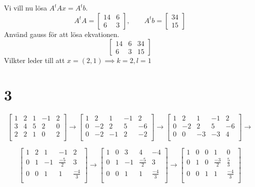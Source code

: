 \documentclass{article}
\begin{document}
Vi vill nu lösa $A^t A x = A^t b$. \\
$$
A^t A = 
\begin{bmatrix}
    14  &  6 \\
    6  &  3 
\end{bmatrix}
,\qquad
A^t b = 
\begin{bmatrix}
    34   \\
    15
\end{bmatrix}
$$
Använd gauss för att lösa ekvationen.
$$
\begin{bmatrix}
    14  &  6  & 34 \\
    6   &  3  & 15
\end{bmatrix}
$$
Vilkter leder till att $x = (2,1) \implies k = 2, l = 1$
\section*{3}
$$
\begin{bmatrix}
    1  &  2  &  1  & -1  &  2 \\
    3  &  4  &  5  &  2  &  0 \\
    2  &  2  &  1  &  0  &  2 \\
\end{bmatrix} \rightarrow 
\begin{bmatrix}
    1  &  2  &  1  & -1  &  2 \\
    0  & -2  &  2  &  5  & -6 \\
    0  & -2  & -1  &  2  & -2 \\
\end{bmatrix} \rightarrow
\begin{bmatrix}
    1  &  2  &  1  & -1  &  2 \\
    0  & -2  &  2  &  5  & -6 \\
    0  &  0  & -3  & -3  &  4 \\
\end{bmatrix} \rightarrow
$$

$$
\begin{bmatrix}
    1  &  2  &  1  & -1  &  2 \\
    0  &  1  & -1  &  \frac{-5}{2}  & 3 \\
    0  &  0  &  1  &  1  &  \frac{-4}{3} \\
\end{bmatrix} \rightarrow
\begin{bmatrix}
    1  &  0  &  3  & 4  &  -4 \\
    0  &  1  & -1  &  \frac{-5}{2}  & 3 \\
    0  &  0  &  1  &  1  &  \frac{-4}{3} \\
\end{bmatrix} \rightarrow
\begin{bmatrix}
    1  &  0  &  0  &  1  &  0 \\
    0  &  1  &  0  &  \frac{-3}{2}  & \frac{5}{3} \\
    0  &  0  &  1  &  1  &  \frac{-4}{3} \\
\end{bmatrix}
$$
\end{document}

